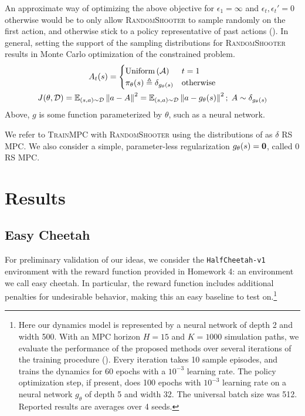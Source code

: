 \documentclass{article}
\begin{document}
An approximate way of optimizing the above objective for $\epsilon_1=\infty$ and $\epsilon_t,\epsilon_t'=0$ otherwise would be to only allow \textsc{RandomShooter} to sample randomly on the first action, and otherwise stick to a policy representative of past actions (). In general, setting the support of the sampling distributions for \textsc{RandomShooter} results in Monte Carlo optimization of the constrained problem.
\begin{equation}\label{eq:delta}
  \begin{gathered}
  A_t(s)=\begin{cases}
\operatorname{Uniform}\left({\mathcal{A}}\right)    & t=1 \\
\pi_\theta(s)\triangleq\delta_{g_\theta(s)} & \text{otherwise}
\end{cases} \\
J(\theta,\mathcal{D})=\operatorname{\mathbb{E}}_{(s,a)\sim \mathcal{D}}\left\lVert a-A \right\rVert^2=\operatorname{\mathbb{E}}_{(s,a)\sim \mathcal{D}}\left\lVert a-g_\theta(s) \right\rVert^2;\;A\sim\delta_{g_\theta(s)}
\end{gathered}
\end{equation}
Above, $g$ is some function parameterized by $\theta$, such as a neural network.

We refer to \textsc{TrainMPC} with \textsc{RandomShooter} using the distributions of  as $\delta$ RS MPC. We also consider a simple, parameter-less regularization $g_\theta(s)=\textbf{0}$, called $0$ RS MPC.

\section{Results}


\subsection{Easy Cheetah}\label{sec:easy-cheetah}
For preliminary validation of our ideas, we consider the \texttt{HalfCheetah-v1} environment with the reward function provided in Homework 4: an environment we call easy cheetah. In particular, the reward function includes additional penalties for undesirable behavior, making this an easy baseline to test on.\footnote{Here our dynamics model is represented by a neural network of depth 2 and width 500. With an MPC horizon $H=15$ and $K=1000$ simulation paths, we evaluate the performance of the proposed methods over several iterations of the training procedure (). Every iteration takes 10 sample episodes, and trains the dynamics for 60 epochs with a $10^{-3}$ learning rate. The policy optimization step, if present, does 100 epochs with $10^{-3}$ learning rate on a neural network $g_\theta$ of depth 5 and width 32. The universal batch size was 512. Reported results are averages over 4 seeds.}
\end{document}
